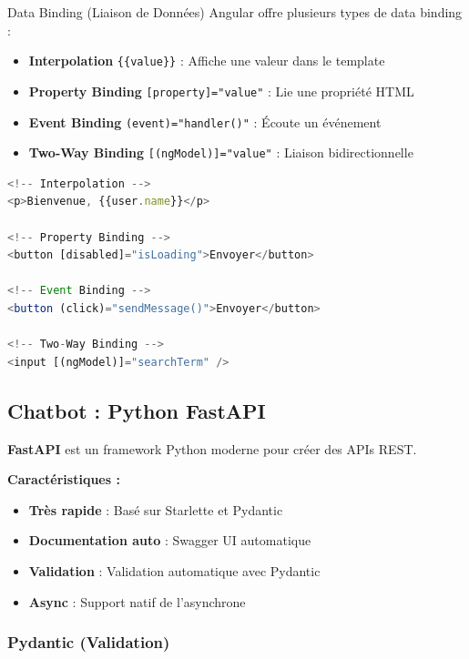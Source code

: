 \documentclass[12pt,a4paper]{article}
\begin{document}
\begin{defbox}{Data Binding (Liaison de Données)}
Angular offre plusieurs types de data binding :

\begin{itemize}
    \item \textbf{Interpolation} \texttt{\{\{value\}\}} : Affiche une valeur dans le template
    \item \textbf{Property Binding} \texttt{[property]="value"} : Lie une propriété HTML
    \item \textbf{Event Binding} \texttt{(event)="handler()"} : Écoute un événement
    \item \textbf{Two-Way Binding} \texttt{[(ngModel)]="value"} : Liaison bidirectionnelle
\end{itemize}

\begin{lstlisting}[language=TypeScript]
<!-- Interpolation -->
<p>Bienvenue, {{user.name}}</p>

<!-- Property Binding -->
<button [disabled]="isLoading">Envoyer</button>

<!-- Event Binding -->
<button (click)="sendMessage()">Envoyer</button>

<!-- Two-Way Binding -->
<input [(ngModel)]="searchTerm" />
\end{lstlisting}
\end{defbox}

\newpage

\subsection{Chatbot : Python FastAPI}

\begin{pythonbox}
\textbf{FastAPI} est un framework Python moderne pour créer des APIs REST.

\textbf{Caractéristiques :}
\begin{itemize}
    \item \textbf{Très rapide} : Basé sur Starlette et Pydantic
    \item \textbf{Documentation auto} : Swagger UI automatique
    \item \textbf{Validation} : Validation automatique avec Pydantic
    \item \textbf{Async} : Support natif de l'asynchrone
\end{itemize}
\end{pythonbox}

\subsubsection{Pydantic (Validation)}
\end{document}
